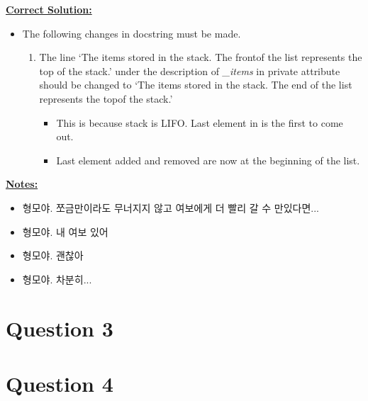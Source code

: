 \documentclass[12pt]{article}
\begin{document}
\begin{mdframed}
    \underline{\textbf{Correct Solution:}}

    \bigskip

    \begin{itemize}
        \item

        The following changes in docstring must be made.

        \begin{enumerate}[1.]
            \item The line `The items stored in the stack. The \color{red}front\color{black}\:of the list represents the top of the stack.'
            under the description of \textit{\_items} in private attribute should be changed to
            `The items stored in the stack. The end of the list represents the \color{red}top\color{black}\:of the stack.'
            \color{red}
                \begin{itemize}
                    \item This is because stack is LIFO. Last element in is the first to come out.
                    \item Last element added and removed are now at the beginning of the list.
                \end{itemize}
            \color{black}
        \end{enumerate}
    \end{itemize}

\end{mdframed}

\bigskip

\underline{\textbf{Notes:}}

\bigskip

\begin{itemize}
    \item 형모야. 쪼금만이라도 무너지지 않고 여보에게 더 빨리 갈 수 만있다면...
    \item 형모야. 내 여보 있어
    \item 형모야. 괜찮아
    \item 형모야. 차분히...
\end{itemize}


\section*{Question 3}

\section*{Question 4}
\end{document}

